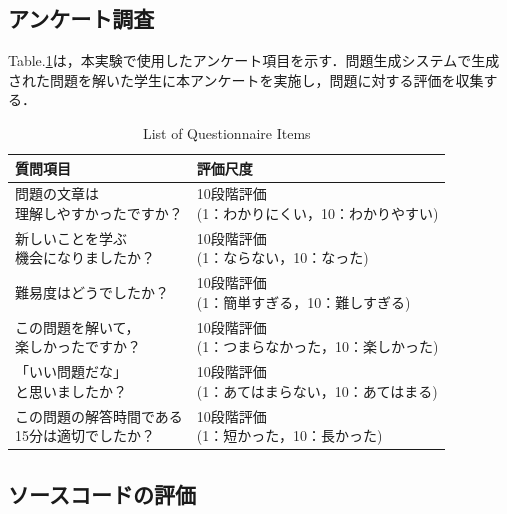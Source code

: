 \documentclass[twocolumn, fleqn, uplatex]{jsarticle}
\begin{document}
\subsection{アンケート調査}
Table.\ref{tab:List_Question}は，本実験で使用したアンケート項目を示す．問題生成システムで生成された問題を解いた学生に本アンケートを実施し，問題に対する評価を収集する．


\begin{table}[t]
    \centering
    \caption{List of Questionnaire Items}
    \label{tab:List_Question}
    \footnotesize
    \begin{tabular}{|l|l|}
        \hline
        \textbf{質問項目} & \textbf{評価尺度} \\
        \hline
        \makecell[l]{問題の文章は\\理解しやすかったですか？} & \makecell[l]{10段階評価 \\ (1：わかりにくい，10：わかりやすい)} \\
        \hline
        \makecell[l]{新しいことを学ぶ\\機会になりましたか？} & \makecell[l]{10段階評価 \\ (1：ならない，10：なった)} \\
        \hline
        難易度はどうでしたか？ & \makecell[l]{10段階評価 \\ (1：簡単すぎる，10：難しすぎる)} \\
        \hline
        \makecell[l]{この問題を解いて，\\楽しかったですか？} & \makecell[l]{10段階評価 \\ (1：つまらなかった，10：楽しかった)} \\
        \hline
        \makecell[l]{「いい問題だな」\\と思いましたか？} & \makecell[l]{10段階評価 \\ (1：あてはまらない，10：あてはまる)} \\
        \hline
        \makecell[l]{この問題の解答時間である\\15分は適切でしたか？} & \makecell[l]{10段階評価 \\ (1：短かった，10：長かった)} \\
        \hline
    \end{tabular}
\end{table}


\subsection{ソースコードの評価}
\end{document}
